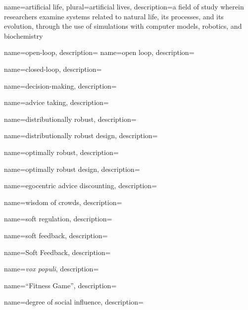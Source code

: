 

	{
		name={artificial life},
		plural={artificial lives},
		description={a field of study wherein researchers examine systems related to natural life, its processes, and its evolution, through the use of simulations with computer models, robotics, and biochemistry}
	}

	{
		name={open-loop},
		description={}
	}
	{
		name={open loop},
		description={}
	}	

	{
		name={closed-loop},
		description={}
	}	
	
	{
		name={decision-making},
		description={}
	}

	{
		name={advice taking},
		description={}
	}	
	
	{
		name={distributionally robust},
		description={}
	}
	
	{
		name={distributionally robust design},
		description={}
	}	

	{
		name={optimally robust},
		description={}
	}

	{
		name={optimally robust design},
		description={}
	}

	{
		name={egocentric advice discounting},
		description={}
	}
	
	{
		name={wisdom of crowds},
		description={}
	}

	{
		name={soft regulation},
		description={}
	}

	{
		name={soft feedback},
		description={}
	}

	{
		name={Soft Feedback},
		description={}
	}	
	
	{
		name={{\it vox populi}},
		description={}
	}

	{
		name={``Fitness Game''},
		description={}
	}

	{
		name={degree of social influence},
		description={}
	}

